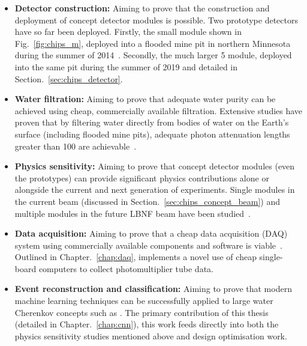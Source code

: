 \begin{itemize}
    \item \textbf{Detector construction:} Aiming to prove that the construction and deployment of
          \chips concept detector modules is possible. Two prototype detectors have so far been
          deployed. Firstly, the small \chipsm module shown in Fig.~\ref{fig:chips_m}, deployed
          into a flooded mine pit in northern Minnesota during the summer of 2014~\cite{perch2015,
              pfutznerProto2017, pfutzner2017}. Secondly, the much larger \unit{5}{}
          \chipsfive module, deployed into the same pit during the summer of 2019 and detailed in
          Section.~\ref{sec:chips_detector}.

    \item \textbf{Water filtration:} Aiming to prove that adequate water purity can be achieved
          using cheap, commercially available filtration. Extensive studies have proven that by
          filtering water directly from bodies of water on the Earth's surface (including flooded
          mine pits), adequate photon attenuation lengths greater than \unit{100}{} are
          achievable~\cite{amat2017, campbell2020}.

    \item \textbf{Physics sensitivity:} Aiming to prove that \chips concept detector modules (even
          the prototypes) can provide significant physics contributions alone or alongside the
          current and next generation of experiments. Single modules in the current \numi beam
          (discussed in Section.~\ref{sec:chips_concept_beam}) and multiple modules in the future
          LBNF beam have been studied~\cite{pfutzner2017, adde2016, lang2015}.

    \item \textbf{Data acquisition:} Aiming to prove that a cheap data acquisition (DAQ) system
          using commercially available components and software is viable~\cite{eijk2018}. Outlined
          in Chapter.~\ref{chap:daq}, \chips implements a novel use of cheap single-board
          computers to collect photomultiplier tube data.

    \item \textbf{Event reconstruction and classification:} Aiming to prove that modern machine
          learning techniques can be successfully applied to large water Cherenkov concepts such
          as \chips. The primary contribution of this thesis (detailed in
          Chapter.~\ref{chap:cnn}), this work feeds directly into both the physics sensitivity
          studies mentioned above and design optimisation work.
\end{itemize}

